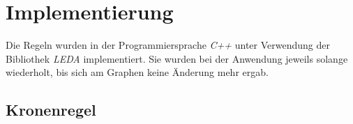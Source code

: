 
\chapter{Implementierung}
\label{ch:Implementierung}


Die Regeln wurden in der Programmiersprache \emph{C++} unter Verwendung der Bibliothek \emph{LEDA} \cite{manual} implementiert. Sie wurden bei der Anwendung jeweils solange wiederholt, bis sich am Graphen keine Änderung mehr ergab. 

\section{Kronenregel}
\label{ch:Implementierung:sec:Kronenregel}

